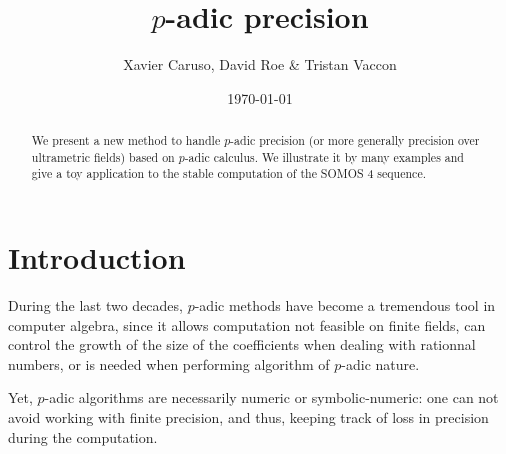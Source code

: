 \documentclass{lms}
\begin{document}
\newtheorem{theo}{Theorem}[section]
\newtheorem{lem}[theo]{Lemma}
\newtheorem{prop}[theo]{Proposition}
\newtheorem{cor}[theo]{Corollary}
\newtheorem{quest}[theo]{Question}
\newtheorem{rem}[theo]{Remark}
\newtheorem{ex}[theo]{Example}
\newtheorem{deftn}[theo]{Definition}
\newtheorem{rmk}[theo]{Remark}

\newcommand{\Z}{\mathbb Z}
\newcommand{\Zp}{\Z_p}
\newcommand{\Q}{\mathbb Q}
\newcommand{\Qp}{\Q_p}
\newcommand{\R}{\mathbb R}
\renewcommand{\O}{\mathcal O}
\newcommand{\XX}{\mathbf X}
\newcommand{\trans}{{}^{\text t}}

\newcommand{\GL}{\text{\rm GL}}

\newcommand{\val}{\text{\rm val}}
\newcommand{\tr}{\text{\rm Tr}}
\newcommand{\com}{\text{\rm Com}}
\newcommand{\Grass}{\text{\rm Grass}}
\renewcommand{\prec}{\text{\rm prec}}

\def\todo#1{\ \!\!{\color{red} #1}}
\def\todofor#1#2{\ \!\!{\color{purple} {\bf #1}: #2}}

\title{$p$-adic precision}
\author{Xavier Caruso, David Roe \& Tristan Vaccon}
\date\today

\maketitle
\begin{abstract}
We present a new method to handle $p$-adic precision (or more generally
precision over ultrametric fields) based on $p$-adic calculus.
We illustrate it by many examples and give a toy application to the
stable computation of the SOMOS 4 sequence.
\end{abstract}

\setcounter{tocdepth}{1}
\tableofcontents

\section{Introduction}

During the last two decades, $p$-adic methods have become a tremendous tool in computer algebra, since it allows computation not feasible on finite fields, can control the growth of the size of the coefficients when dealing with rationnal numbers, or is needed when performing algorithm of $p$-adic nature.

Yet, $p$-adic algorithms are necessarily numeric or symbolic-numeric: one can not avoid working with finite precision, and thus, keeping track of loss in precision during the computation.
\end{document}
